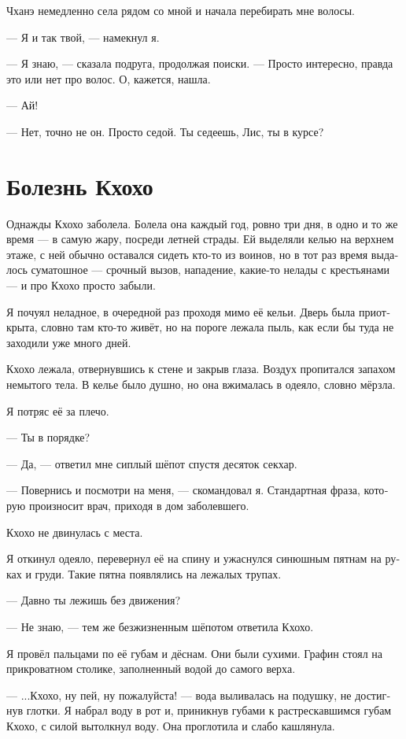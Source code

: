 \documentclass[a4paper,12pt,fleqn]{book}\usepackage{polyglossia}\setdefaultlanguage[babelshorthands=true]{russian}\setotherlanguage{english}\defaultfontfeatures{Ligatures=TeX,Mapping=tex-text}\usepackage{xcolor}\newcommand{\ml}[3]{#2}
\begin{document}
{Чханэ немедленно села рядом со мной и начала перебирать мне волосы.

--- Я и так твой, --- намекнул я.

--- Я знаю, --- сказала подруга, продолжая поиски.
--- Просто интересно, правда это или нет про волос.
О, кажется, нашла.

--- Ай!

--- Нет, точно не он.
Просто седой.
Ты седеешь, Лис, ты в курсе?

\section{Болезнь Кхохо}

Однажды Кхохо заболела.
Болела она каждый год, ровно три дня, в одно и то же время --- в самую жару, посреди летней страды.
Ей выделяли келью на верхнем этаже, с ней обычно оставался сидеть кто-то из воинов, но в тот раз время выдалось суматошное --- срочный вызов, нападение, какие-то нелады с крестьянами --- и про Кхохо просто забыли.

Я почуял неладное, в очередной раз проходя мимо её кельи.
Дверь была приоткрыта, словно там кто-то живёт, но на пороге лежала пыль, как если бы туда не заходили уже много дней.

Кхохо лежала, отвернувшись к стене и закрыв глаза.
Воздух пропитался запахом немытого тела.
В келье было душно, но она вжималась в одеяло, словно мёрзла.

Я потряс её за плечо.

--- Ты в порядке?

--- Да, --- ответил мне сиплый шёпот спустя десяток секхар.

--- Повернись и посмотри на меня, --- скомандовал я.
Стандартная фраза, которую произносит врач, приходя в дом заболевшего.

Кхохо не двинулась с места.

Я откинул одеяло, перевернул её на спину и ужаснулся синюшным пятнам на руках и груди.
Такие пятна появлялись на лежалых трупах.

--- Давно ты лежишь без движения?

--- Не знаю, --- тем же безжизненным шёпотом ответила Кхохо.

Я провёл пальцами по её губам и дёснам.
Они были сухими.
Графин стоял на прикроватном столике, заполненный водой до самого верха.

---  ...Кхохо, ну пей, ну пожалуйста! --- вода выливалась на подушку, не достигнув глотки.
Я набрал воду в рот и, приникнув губами к растрескавшимся губам Кхохо, с силой вытолкнул воду.
Она проглотила и слабо кашлянула.

}
\end{document}
